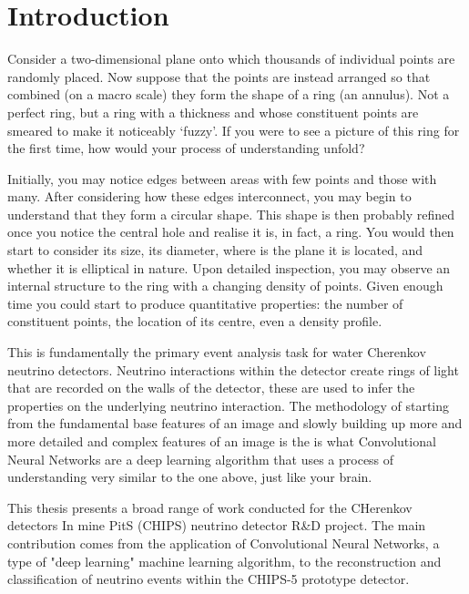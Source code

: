 \chapter{Introduction} %
\label{chap:introduction} %
\setcounter{page}{17}  %

Consider a two-dimensional plane onto which thousands of individual points are randomly placed.
Now suppose that the points are instead arranged so that combined (on a macro scale) they form the
shape of a ring (an annulus). Not a perfect ring, but a ring with a thickness and whose
constituent points are smeared to make it noticeably `fuzzy'. If you were to see a picture of this
ring for the first time, how would your process of understanding unfold?

Initially, you may notice edges between areas with few points and those with many. After
considering how these edges interconnect, you may begin to understand that they form a circular
shape. This shape is then probably refined once you notice the central hole and realise it is, in
fact, a ring. You would then start to consider its size, its diameter, where is the plane it is
located, and whether it is elliptical in nature. Upon detailed inspection, you may observe an
internal structure to the ring with a changing density of points. Given enough time you could
start to produce quantitative properties: the number of constituent points, the location of its
centre, even a density profile.

This is fundamentally the primary event analysis task for water Cherenkov neutrino detectors.
Neutrino interactions within the detector create rings of light that are recorded on the walls of
the detector, these are used to infer the properties on the underlying neutrino interaction. The
methodology of starting from the fundamental base features of an image and slowly building up more
and more detailed and complex features of an image is the is what Convolutional Neural Networks
are a deep learning algorithm that uses a process of understanding very similar to the one above,
just like your brain. 

This thesis presents a broad range of work conducted for the CHerenkov detectors In mine PitS
(CHIPS) neutrino detector R\&D project. The main contribution comes from the application of
Convolutional Neural Networks, a type of "deep learning" machine learning algorithm, to the
reconstruction and classification of neutrino events within the CHIPS-5 prototype detector.

